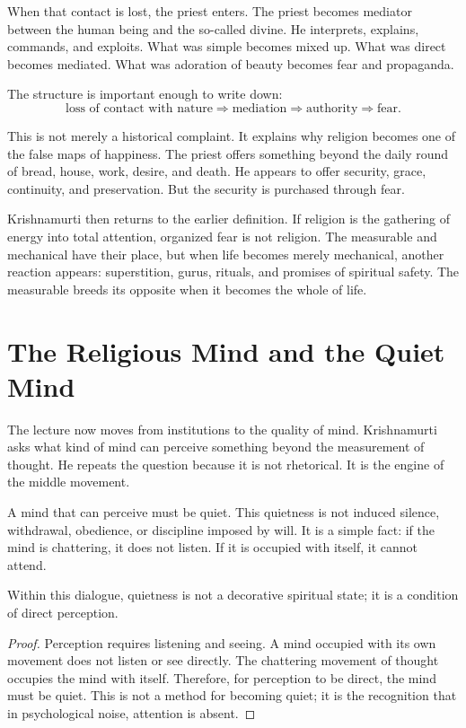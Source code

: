 When that contact is lost, the priest enters. The priest becomes mediator between the human being and the so-called divine. He interprets, explains, commands, and exploits. What was simple becomes mixed up. What was direct becomes mediated. What was adoration of beauty becomes fear and propaganda.

The structure is important enough to write down:
\begin{equation}
\text{loss of contact with nature}
\Rightarrow
\text{mediation}
\Rightarrow
\text{authority}
\Rightarrow
\text{fear}.
\end{equation}

This is not merely a historical complaint. It explains why religion becomes one of the false maps of happiness. The priest offers something beyond the daily round of bread, house, work, desire, and death. He appears to offer security, grace, continuity, and preservation. But the security is purchased through fear.

Krishnamurti then returns to the earlier definition. If religion is the gathering of energy into total attention, organized fear is not religion. The measurable and mechanical have their place, but when life becomes merely mechanical, another reaction appears: superstition, gurus, rituals, and promises of spiritual safety. The measurable breeds its opposite when it becomes the whole of life.

\section{The Religious Mind and the Quiet Mind}

The lecture now moves from institutions to the quality of mind. Krishnamurti asks what kind of mind can perceive something beyond the measurement of thought. He repeats the question because it is not rhetorical. It is the engine of the middle movement.

A mind that can perceive must be quiet. This quietness is not induced silence, withdrawal, obedience, or discipline imposed by will. It is a simple fact: if the mind is chattering, it does not listen. If it is occupied with itself, it cannot attend.

\begin{proposition}
Within this dialogue, quietness is not a decorative spiritual state; it is a condition of direct perception.
\end{proposition}

\begin{proof}
Perception requires listening and seeing. A mind occupied with its own movement does not listen or see directly. The chattering movement of thought occupies the mind with itself. Therefore, for perception to be direct, the mind must be quiet. This is not a method for becoming quiet; it is the recognition that in psychological noise, attention is absent.
\end{proof}

